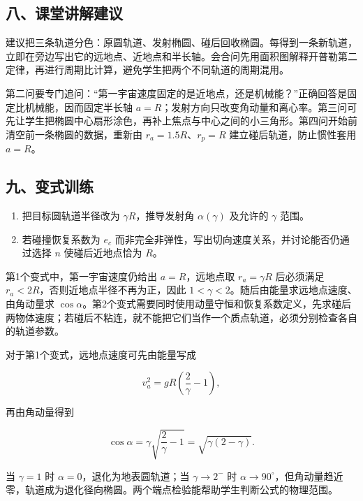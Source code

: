 \documentclass[12pt,a4paper,UTF8]{ctexart}
\newcommand{\tightlist}{\setlength{\itemsep}{0pt}\setlength{\parskip}{0pt}}
\begin{document}
\subsection{八、课堂讲解建议}\label{ux516bux8bfeux5802ux8bb2ux89e3ux5efaux8bae-2}

建议把三条轨道分色：原圆轨道、发射椭圆、碰后回收椭圆。每得到一条新轨道，立即在旁边写出它的远地点、近地点和半长轴。会合问先用面积图解释开普勒第二定律，再进行周期比计算，避免学生把两个不同轨道的周期混用。

第二问要专门追问：``第一宇宙速度固定的是近地点，还是机械能？''正确回答是固定比机械能，因而固定半长轴
\(a=R\)；发射方向只改变角动量和离心率。第三问可先让学生把椭圆中心扇形涂色，再补上焦点与中心之间的小三角形。第四问开始前清空前一条椭圆的数据，重新由
\(r_a=1.5R\)、\(r_p=R\) 建立碰后轨道，防止惯性套用 \(a=R\)。

\subsection{九、变式训练}\label{ux4e5dux53d8ux5f0fux8badux7ec3-2}

\begin{enumerate}
\def\labelenumi{\arabic{enumi}.}
\tightlist
\item
  把目标圆轨道半径改为 \(\gamma R\)，推导发射角 \(\alpha(\gamma)\)
  及允许的 \(\gamma\) 范围。
\item
  若碰撞恢复系数为 \(e_c\)
  而非完全非弹性，写出切向速度关系，并讨论能否仍通过选择 \(n\)
  使碰后近地点恰为 \(R\)。
\end{enumerate}

第1个变式中，第一宇宙速度仍给出 \(a=R\)，远地点取 \(r_a=\gamma R\)
后必须满足 \(r_a<2R\)，否则近地点半径不再为正，因此
\(1<\gamma<2\)。随后由能量求远地点速度、由角动量求
\(\cos\alpha\)。第2个变式需要同时使用动量守恒和恢复系数定义，先求碰后两物体速度；若碰后不粘连，就不能把它们当作一个质点轨道，必须分别检查各自的轨道参数。

对于第1个变式，远地点速度可先由能量写成

\[
v_a^2=gR\left(\frac{2}{\gamma}-1\right),
\]

再由角动量得到

\[
\cos\alpha=\gamma\sqrt{\frac{2}{\gamma}-1}
=\sqrt{\gamma(2-\gamma)}.
\]

当 \(\gamma=1\) 时 \(\alpha=0\)，退化为地表圆轨道；当 \(\gamma\to2^-\)
时
\(\alpha\to90^\circ\)，但角动量趋近零，轨道成为退化径向椭圆。两个端点检验能帮助学生判断公式的物理范围。

\newpage
\end{document}
